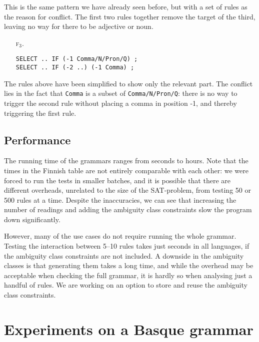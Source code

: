{{This is the same pattern we have already seen before, but with a set of rules as the reason for conflict.
The first two rules together remove the target of the third, leaving no way for there to be adjective or noun.

\begin{itemize}
\item[\textsc{f$_3$.}]\begin{verbatim}
SELECT .. IF (-1 Comma/N/Pron/Q) ;
SELECT .. IF (-2 ..) (-1 Comma) ;
\end{verbatim}
\end{itemize}

The rules above have been simplified to show only the relevant part.
The conflict lies in the fact that \texttt{Comma} is a subset of \texttt{Comma/N/Pron/Q}:
there is no way to trigger the second rule without placing a comma in position -1, and thereby triggering the first rule.


\subsection{Performance}
The running time of the grammars ranges from seconds to hours.
Note that the times in the Finnish table are not entirely comparable with each other: we were forced to run the tests in smaller batches, and it is possible that there are different overheads, unrelated to the size of the SAT-problem, from testing 50 or 500 rules at a time.
Despite the inaccuracies, we can see that increasing the number of readings
and adding the ambiguity class constraints
slow the program down significantly.

However, many of the use cases do not require running the whole
grammar. Testing the interaction between 5--10 rules takes just
seconds in all languages, if the ambiguity class constraints are not included.
A downside in the ambiguity classes is that generating them takes a long time,
and while the overhead may be acceptable when checking the full grammar,
it is hardly so when analysing just a handful of rules.
We are working on an option to store and reuse the ambiguity class constraints.

\section{Experiments on a Basque grammar}
\label{sec:basqueEval}

}}
